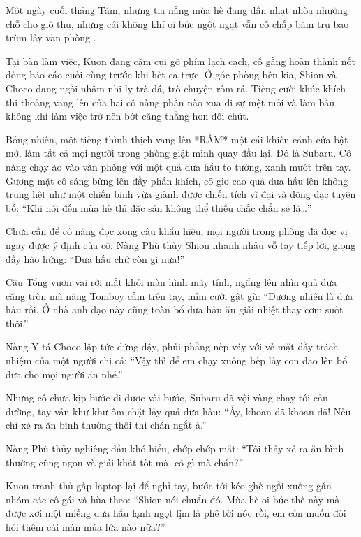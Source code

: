 \documentclass[../main.tex]{subfiles}
\begin{document}
\color{black}

Một ngày cuối tháng Tám, những tia nắng mùa hè đang dần nhạt nhòa nhường chỗ cho gió thu, nhưng cái không khí oi bức ngột ngạt vẫn cố chấp bám trụ bao trùm lấy văn phòng \hll.

Tại bàn làm việc, Kuon đang cặm cụi gõ phím lạch cạch, cố gắng hoàn thành nốt đống báo cáo cuối cùng trước khi hết ca trực. Ở góc phòng bên kia, Shion và Choco đang ngồi nhâm nhi ly trà đá, trò chuyện rôm rả. Tiếng cười khúc khích thi thoảng vang lên của hai cô nàng phần nào xua đi sự mệt mỏi và làm bầu không khí làm việc trở nên bớt căng thẳng hơn đôi chút.

Bỗng nhiên, một tiếng thình thịch vang lên *RẦM* một cái khiến cánh cửa bật mở, làm tất cả mọi người trong phòng giật mình quay đầu lại. Đó là Subaru. Cô nàng chạy ào vào văn phòng với một quả dưa hấu to tướng, xanh mướt trên tay. Gương mặt cô sáng bừng lên đầy phấn khích, cô giơ cao quả dưa hấu lên không trung hệt như một chiến binh vừa giành được chiến tích vĩ đại và dõng dạc tuyên bố:
``Khi nói đến mùa hè thì đặc sản không thể thiếu chắc chắn sẽ là\dots''

Chưa cần để cô nàng đọc xong câu khẩu hiệu, mọi người trong phòng đã đọc vị ngay được ý định của cô. Nàng Phù thủy Shion nhanh nhảu vỗ tay tiếp lời, giọng đầy hào hứng:
``Dưa hấu chứ còn gì nữa!''

Cậu Tổng vươn vai rời mắt khỏi màn hình máy tính, ngẩng lên nhìn quả dưa căng tròn mà nàng Tomboy cầm trên tay, mỉm cười gật gù:
``Đương nhiên là dưa hấu rồi. Ở nhà anh dạo này cũng toàn bổ dưa hấu ăn giải nhiệt thay cơm suốt thôi.''

Nàng Y tá Choco lập tức đứng dậy, phủi phẳng nếp váy với vẻ mặt đầy trách nhiệm của một người chị cả:
``Vậy thì để em chạy xuống bếp lấy con dao lên bổ dưa cho mọi người ăn nhé.''

Nhưng cô chưa kịp bước đi được vài bước, Subaru đã vội vàng chạy tới cản đường, tay vẫn khư khư ôm chặt lấy quả dưa hấu:
``Ấy, khoan đã khoan đã! Nếu chỉ xẻ ra ăn bình thường thôi thì chán ngắt à.''

Nàng Phù thủy nghiêng đầu khó hiểu, chớp chớp mắt:
``Tôi thấy xẻ ra ăn bình thường cũng ngon và giải khát tốt mà, có gì mà chán?''

Kuon tranh thủ gấp laptop lại để nghỉ tay, bước tới kéo ghế ngồi xuống gần nhóm các cô gái và hùa theo:
``Shion nói chuẩn đó. Mùa hè oi bức thế này mà được xơi một miếng dưa hấu lạnh ngọt lịm là phê tới nóc rồi, em còn muốn đòi hỏi thêm cái màn múa lửa nào nữa?''
\end{document}
